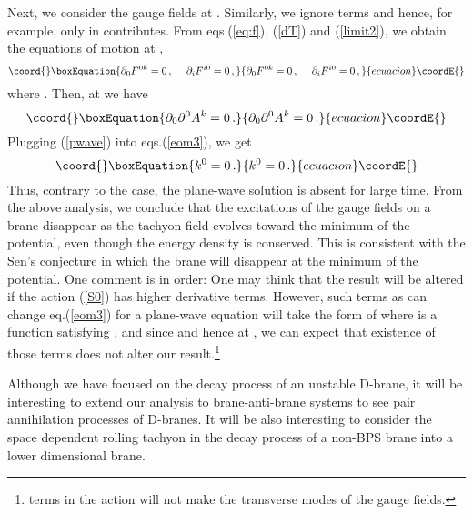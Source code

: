 \documentclass[12pt,a4paper]{article}
\providecommand{\p}{\partial}
\providecommand{\calO}{\mathcal{O}}
\begin{document}
Next, we consider the gauge fields at \coordHE{}.
Similarly, we ignore \myHighlight{$\calO(\varphi^2)$}\coordHE{} terms and hence, for
example, only \coordHE{} in \myHighlight{$\p_\lambda T \p_\rho T$}\coordHE{} contributes.
{}From eqs.(\ref{eq:f}), (\ref{dT}) and (\ref{limit2}), we obtain
the equations of motion at \coordHE{},
\begin{equation}\coord{}\boxEquation{
  \p_0 F^{0 k}=0\,,\hspace{3ex} \p_i F^{i0}=0\,,
}{
  \p_0 F^{0 k}=0\,,\hspace{3ex} \p_i F^{i0}=0\,,
}{ecuacion}\coordE{}\end{equation}
where \coordHE{}.
Then, at \coordHE{} we have
\begin{equation}\coord{}\boxEquation{
	\p_0 \p^0 A^k =0\,. \label{eom3}
}{
	\p_0 \p^0 A^k =0\,. }{ecuacion}\coordE{}\end{equation}
Plugging (\ref{pwave}) into eqs.(\ref{eom3}), we get
\begin{equation}\coord{}\boxEquation{
	k^0 =0\,.
}{
	k^0 =0\,.
}{ecuacion}\coordE{}\end{equation}
Thus, contrary to the \coordHE{} case, the plane-wave solution is absent
for large time. From the above analysis, we conclude that the
excitations of the gauge fields on a brane disappear as the tachyon
field evolves toward the minimum of the potential, even though the
energy density is conserved. This is consistent with the Sen's
conjecture in which the brane will disappear at the minimum of the
potential. One comment is in order: One may think that the
result will be altered if the action (\ref{S0}) has higher derivative
terms. However, such terms as can change eq.(\ref{eom3}) for a
plane-wave equation will take the form of \myHighlight{$f(\p^2 T,\p^3 T,\dots)\cdot
F^2$}\coordHE{} where \coordHE{} is a function satisfying \coordHE{}, and since \myHighlight{$\dot T\to
1 +\calO(\varphi^2)$}\coordHE{} and hence \myHighlight{$f(\p^2 T,\p^3 T,\dots)\to 0$}\coordHE{} at
\coordHE{}, we can expect that existence of those terms does not
alter our result.\footnote{\myHighlight{$\p F,\p^2 F,\dots$}\coordHE{} terms in the action
will not make the transverse modes of the gauge fields.}

Although we have focused on the decay process of an unstable D-brane,
it will be interesting to extend our analysis to brane-anti-brane
systems to see pair annihilation processes of D-branes.
It will be also interesting to consider the space dependent rolling
tachyon in the decay process of a non-BPS brane into a lower
dimensional brane.
\end{document}
